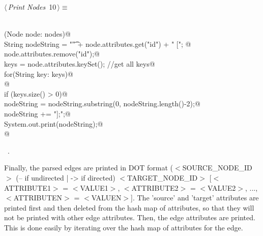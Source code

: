 \documentclass[a4paper]{report}
\begin{document}
\begin{flushleft} \small
\begin{minipage}{\linewidth}\label{scrap10}\raggedright\small
{} $\langle\,${\itshape Print Nodes}\nobreak\ {\footnotesize {10}}$\,\rangle\equiv$
\vspace{-1ex}
\begin{list}{}{} \item
\mbox{}\verb@@\\
\mbox{}\verb@for (Node node: nodes){@\\
\mbox{}\verb@        String nodeString = "\t" + node.attributes.get("id") + " ["; @\\
\mbox{}\verb@        node.attributes.remove("id");@\\
\mbox{}\verb@        keys = node.attributes.keySet();  //get all keys@\\
\mbox{}\verb@        for(String key: keys)@\\
\mbox{}   @\\
\mbox{}\verb@        if (keys.size() > 0)@\\
\mbox{}\verb@                nodeString = nodeString.substring(0, nodeString.length()-2);@\\
\mbox{}\verb@        nodeString += "];\n";@\\
\mbox{}\verb@        System.out.print(nodeString);@\\
\mbox{}\verb@}@\\
\mbox{}\verb@@{\NWsep}
\end{list}
\vspace{-1.5ex}
\footnotesize
\begin{list}{}{\setlength{\itemsep}{-\parsep}\setlength{\itemindent}{-\leftmargin}}
\item \NWtxtMacroRefIn\ .

\item{}
\end{list}
\end{minipage}\vspace{4ex}
\end{flushleft}
Finally, the parsed edges are printed in DOT format ($<$SOURCE\_NODE\_ID$>$ (-- if undirected | -> if directed) $<$TARGET\_NODE\_ID$>$ [$<$ATTRIBUTE1$>$ = $<$VALUE1$>$, $<$ATTRIBUTE2$>$ = $<$VALUE2$>$, ..., $<$ATTRIBUTEN$>$ = $<$VALUEN$>$]. The 'source' and 'target' attributes are printed first and then deleted from the hash map of attributes, so that they will not be printed with other edge attributes. Then, the edge attributes are printed. This is done easily by iterating over the hash map of attributes for the edge. 
\end{document}

